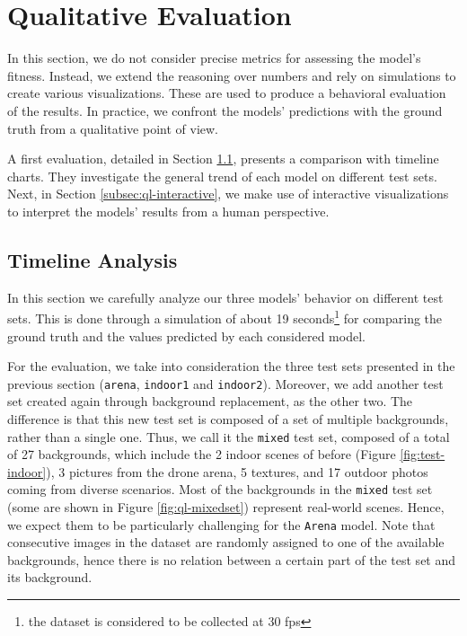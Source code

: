 



\section{Qualitative Evaluation}
\label{sec:evaluation-qualitative}

In this section, we do not consider precise metrics for assessing the model's fitness. Instead, we extend the reasoning over numbers and rely on simulations to create various visualizations. These are used to produce a behavioral evaluation of the results. In practice, we confront the models' predictions with the ground truth from a qualitative point of view.

A first evaluation, detailed in Section \ref{subsec:ql-timeline}, presents a comparison with timeline charts. They investigate the general trend of each model on different test sets. Next, in Section \ref{subsec:ql-interactive}, we make use of interactive visualizations to interpret the models' results from a human perspective.



\subsection{Timeline Analysis}
\label{subsec:ql-timeline}

In this section we carefully analyze our three models' behavior on different test sets. This is done through a simulation of about 19 seconds\footnote{the dataset is considered to be collected at 30 \gls{fps}} for comparing the ground truth and the values predicted by each considered model.

For the evaluation, we take into consideration the three test sets presented in the previous section (\texttt{arena}, \texttt{indoor1} and \texttt{indoor2}). Moreover, we add another test set created again through background replacement, as the other two. The difference is that this new test set is composed of a set of multiple backgrounds, rather than a single one. Thus, we call it the \texttt{mixed} test set, composed of a total of 27 backgrounds, which include the 2 indoor scenes of before (Figure \ref{fig:test-indoor}), 3 pictures from the drone arena, 5 textures, and 17 outdoor photos coming from diverse scenarios. Most of the backgrounds in the \texttt{mixed} test set (some are shown in Figure \ref{fig:ql-mixedset}) represent real-world scenes. Hence, we expect them to be particularly challenging for the \texttt{Arena} model. Note that consecutive images in the dataset are randomly assigned to one of the available backgrounds, hence there is no relation between a certain part of the test set and its background.

